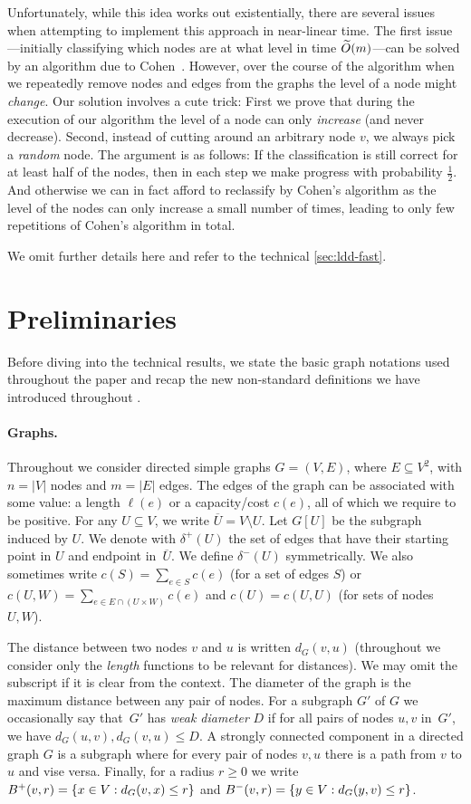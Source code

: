 \documentclass[letterpaper,11pt]{article}
\begin{document}
Unfortunately, while this idea works out existentially, there are several issues when attempting to implement this approach in near-linear time. The first issue---initially classifying which nodes are at what level in time $\widetilde{O}(m)$---can be solved by an algorithm due to Cohen~\cite{Cohen97}. However, over the course of the algorithm when we repeatedly remove nodes and edges from the graphs the level of a node might \emph{change}. Our solution involves a cute trick: First we prove that during the execution of our algorithm the level of a node can only \emph{increase} (and never decrease). Second, instead of cutting around an arbitrary node $v$, we always pick a \emph{random} node. The argument is as follows: If the classification is still correct for at least half of the nodes, then in each step we make progress with probability $\frac12$. And otherwise we can in fact afford to reclassify by Cohen's algorithm as the level of the nodes can only increase a small number of times, leading to only few repetitions of Cohen's algorithm in total.

We omit further details here and refer to the technical \cref{sec:ldd-fast}. \section{Preliminaries} \label{sec:prelims}
Before diving into the technical results, we state the basic graph notations used throughout the paper and recap the new non-standard definitions we have introduced throughout .

\paragraph{Graphs.}
Throughout we consider directed simple graphs $G = (V, E)$, where $E \subseteq V^2$, with $n = |V|$ nodes and $m = |E|$ edges. The edges of the graph can be associated with some value: a length $\ell(e)$ or a capacity/cost $c(e)$, all of which we require to be positive. For any $U \subseteq V$, we write $\overline U = V \setminus U$. Let $G[U]$ be the subgraph induced by $U$. We denote with $\delta^{+}(U)$ the set of edges that have their starting point in $U$ and endpoint in~$\overline U$. We define $\delta^{-}(U)$ symmetrically. We also sometimes write $c(S) = \sum_{e \in S} c(e)$ (for a set of edges $S$) or $c(U, W) = \sum_{e \in E \cap (U \times W)} c(e)$ and $c(U) = c(U, U)$ (for sets of nodes $U, W$).

The distance between two nodes $v$ and $u$ is written $d_G(v,u)$ (throughout we consider only the \emph{length} functions to be relevant for distances). We may omit the subscript if it is clear from the context. The diameter of the graph is the maximum distance between any pair of nodes. For a subgraph $G'$ of $G$ we occasionally say that~$G'$ has \emph{weak diameter} $D$ if for all pairs of nodes $u, v$ in~$G'$, we have $d_G(u, v), d_G(v, u) \leq D$. A strongly connected component in a directed graph $G$ is a subgraph where for every pair of nodes $v,u$ there is a path from $v$ to $u$ and vise versa. Finally, for a radius $r \geq 0$ we write $B^+(v, r) = \lbrace x \in V : d_G(v, x) \leq r\rbrace$ and $B^-(v, r) = \lbrace y \in V : d_G(y, v) \leq r\rbrace$.
\end{document}
